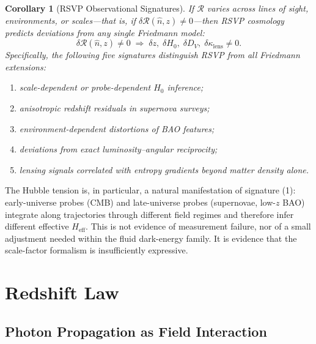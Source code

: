 \documentclass[12pt,a4paper]{article}
\newtheorem{corollary}[theorem]{Corollary}
\theoremstyle{remark}
\newcommand{\Rcal}{\mathcal{R}}
\newcommand{\Heff}{H_{\mathrm{eff}}}
\begin{document}
\begin{corollary}[RSVP Observational Signatures]
\label{cor:signatures}
If $\Rcal$ varies across lines of sight, environments, or scales---that is, if $\delta\Rcal(\hat{n}, z) \ne 0$---then RSVP cosmology predicts deviations from any single Friedmann model:
\begin{equation}
\delta\Rcal(\hat{n}, z) \ne 0 \;\Longrightarrow\;
\delta z,\; \delta H_0,\; \delta D_V,\; \delta\kappa_{\mathrm{lens}} \ne 0.
\end{equation}
Specifically, the following five signatures distinguish RSVP from all Friedmann extensions:
\begin{enumerate}[leftmargin=2em]
\item scale-dependent or probe-dependent $H_0$ inference;
\item anisotropic redshift residuals in supernova surveys;
\item environment-dependent distortions of BAO features;
\item deviations from exact luminosity--angular reciprocity;
\item lensing signals correlated with entropy gradients beyond matter density alone.
\end{enumerate}
\end{corollary}

The Hubble tension is, in particular, a natural manifestation of signature (1): early-universe probes (CMB) and late-universe probes (supernovae, low-$z$ BAO) integrate along trajectories through different field regimes and therefore infer different effective $\Heff$. This is not evidence of measurement failure, nor of a small adjustment needed within the fluid dark-energy family. It is evidence that the scale-factor formalism is insufficiently expressive.

\section{Redshift Law}
\label{sec:redshift}

\subsection{Photon Propagation as Field Interaction}
\end{document}
